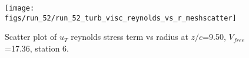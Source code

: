 \begin{figure}[H]
\centering
\texttt{[image: figs/run\_52/run\_52\_turb\_visc\_reynolds\_vs\_r\_meshscatter]}
\caption{Scatter plot of $
u_T$ reynolds stress term vs radius at $z/c$=9.50, $V_{free}$=17.36, station 6.}
\label{fig:run_52_turb_visc_reynolds_vs_r_meshscatter}
\end{figure}


